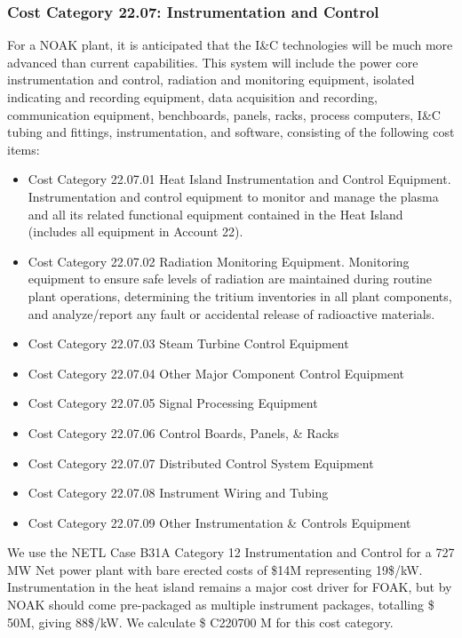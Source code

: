 \subsubsection{Cost Category 22.07: Instrumentation and Control }

For a NOAK plant, it is anticipated that the I\&C technologies will be much more advanced than current  capabilities. This system will include the power core instrumentation and control, radiation and  monitoring equipment, isolated indicating and recording equipment, data acquisition and  recording, communication equipment, benchboards, panels, racks, process computers, I\&C tubing and fittings, instrumentation, and software, consisting of the following cost items:

\begin{itemize}
\item Cost Category 22.07.01 Heat Island Instrumentation and Control Equipment. Instrumentation and control equipment to monitor and manage the plasma and all  its related functional equipment contained in the Heat Island (includes all equipment in Account 22).

\item Cost Category 22.07.02 Radiation Monitoring Equipment. Monitoring equipment to ensure safe levels of radiation are maintained  during routine plant operations, determining the tritium inventories in all plant components, and  analyze/report any fault or accidental release of radioactive materials. 

\item Cost Category 22.07.03 Steam Turbine Control Equipment	

\item Cost Category 22.07.04 Other Major Component Control Equipment	

\item Cost Category 22.07.05 Signal Processing Equipment	

\item Cost Category 22.07.06 Control Boards, Panels, \& Racks	
\item Cost Category 22.07.07 Distributed Control System Equipment	
\item Cost Category 22.07.08 Instrument Wiring and Tubing	
\item Cost Category 22.07.09 Other Instrumentation \& Controls Equipment	


\end{itemize}


We use the NETL Case B31A Category 12 Instrumentation and Control for a 727 MW Net power plant with bare erected costs of \$14M representing 19\$/kW.  Instrumentation in the heat island remains a major cost driver for FOAK, but by NOAK should come pre-packaged as multiple instrument packages, totalling \$ 50M, giving 88\$/kW.   We calculate \$ C220700 M for this cost category.
